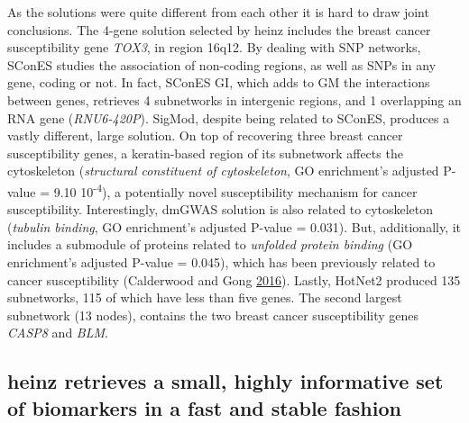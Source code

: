 \documentclass[
  11pt,
]{env/yjiao}
\begin{document}
As the solutions were quite different from each other it is hard to draw
joint conclusions. The 4-gene solution selected by heinz includes the
breast cancer susceptibility gene \emph{TOX3}, in region 16q12. By dealing
with SNP networks, SConES studies the association of non-coding regions,
as well as SNPs in any gene, coding or not. In fact, SConES GI, which
adds to GM the interactions between genes, retrieves 4 subnetworks in
intergenic regions, and 1 overlapping an RNA gene (\emph{RNU6-420P}). SigMod,
despite being related to SConES, produces a vastly different, large
solution. On top of recovering three breast cancer susceptibility genes,
a keratin-based region of its subnetwork affects the cytoskeleton
(\emph{structural constituent of cytoskeleton}, GO enrichment's adjusted
P-value = 9.10 10\textsuperscript{-4}), a potentially novel susceptibility mechanism for
cancer susceptibility. Interestingly, dmGWAS solution is also related to
cytoskeleton (\emph{tubulin binding}, GO enrichment's adjusted P-value =
0.031). But, additionally, it includes a submodule of proteins related
to \emph{unfolded protein binding} (GO enrichment's adjusted P-value =
0.045), which has been previously related to cancer susceptibility
(Calderwood and Gong \protect\hyperlink{ref-calderwood_heat_2016}{2016}). Lastly, HotNet2 produced 135 subnetworks, 115
of which have less than five genes. The second largest subnetwork (13
nodes), contains the two breast cancer susceptibility genes \emph{CASP8} and
\emph{BLM}.

\hypertarget{results-benchmark}{%
\subsection{heinz retrieves a small, highly informative set of biomarkers in a fast and stable fashion}\label{results-benchmark}}
\end{document}
